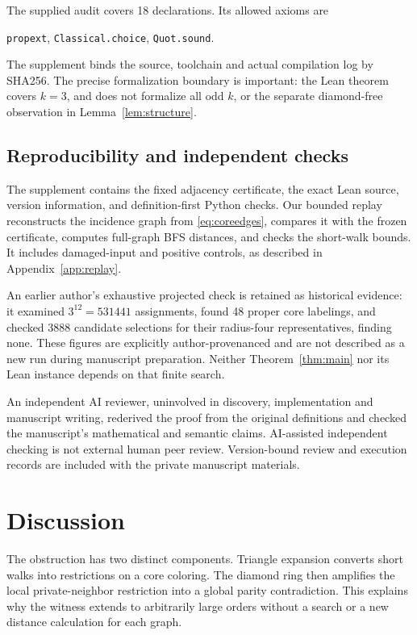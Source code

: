 \documentclass[11pt,a4paper]{article}
\theoremstyle{definition}
\theoremstyle{remark}
\begin{document}
The supplied audit covers 18 declarations. Its allowed axioms are
\begin{center}\small
\texttt{propext}, \texttt{Classical.choice}, \texttt{Quot.sound}.
\end{center}
The supplement binds the source, toolchain and actual compilation
log by SHA256. The precise formalization boundary is important:
the Lean theorem covers \(k=3\), and does not formalize all odd
\(k\), or the separate diamond-free observation in
Lemma~\ref{lem:structure}.

\subsection{Reproducibility and independent checks}

The supplement contains the fixed adjacency certificate, the exact
Lean source, version information, and definition-first Python
checks. Our bounded replay reconstructs the incidence graph from
\eqref{eq:coreedges}, compares it with the frozen certificate,
computes full-graph BFS distances, and checks the short-walk bounds.
It includes damaged-input and positive controls, as described in
Appendix~\ref{app:replay}.

An earlier author's exhaustive projected check is retained as
historical evidence: it examined \(3^{12}=531441\) assignments,
found 48 proper core labelings, and checked 3888 candidate selections
for their radius-four representatives, finding none. These figures
are explicitly author-provenanced and are not described as a new
run during manuscript preparation. Neither Theorem~\ref{thm:main}
nor its Lean instance depends on that finite search.

An independent AI reviewer, uninvolved in discovery, implementation
and manuscript writing, rederived the proof from the original
definitions and checked the manuscript's mathematical and semantic
claims. AI-assisted independent checking is not external human peer
review. Version-bound review and execution records are included with
the private manuscript materials.

\section{Discussion}

The obstruction has two distinct components. Triangle expansion
converts short walks into restrictions on a core coloring. The
diamond ring then amplifies the local private-neighbor restriction
into a global parity contradiction. This explains why the witness
extends to arbitrarily large orders without a search or a new
distance calculation for each graph.
\end{document}

